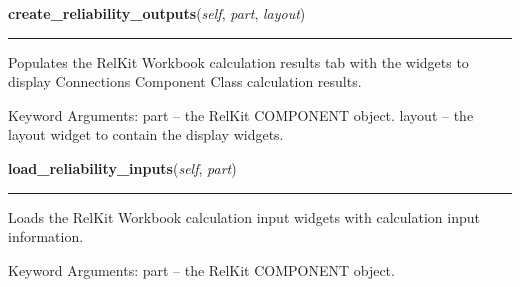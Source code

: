 \hspace{.8\funcindent}\begin{boxedminipage}{\funcwidth}

    \raggedright \textbf{create\_reliability\_outputs}(\textit{self}, \textit{part}, \textit{layout})

    \vspace{-1.5ex}

    \rule{\textwidth}{0.5\fboxrule}
\setlength{\parskip}{2ex}
    Populates the RelKit Workbook calculation results tab with the 
    widgets to display Connections Component Class calculation results.

    Keyword Arguments: part   -- the RelKit COMPONENT object. layout -- 
    the layout widget to contain the display widgets.

\setlength{\parskip}{1ex}
    \end{boxedminipage}

    \label{reliafree:connections:connection:Connection:load_reliability_inputs}

    \vspace{0.5ex}

\hspace{.8\funcindent}\begin{boxedminipage}{\funcwidth}

    \raggedright \textbf{load\_reliability\_inputs}(\textit{self}, \textit{part})

    \vspace{-1.5ex}

    \rule{\textwidth}{0.5\fboxrule}
\setlength{\parskip}{2ex}
    Loads the RelKit Workbook calculation input widgets with calculation
    input information.

    Keyword Arguments: part -- the RelKit COMPONENT object.

\setlength{\parskip}{1ex}
    \end{boxedminipage}

    \label{reliafree:connections:connection:Connection:load_reliability_outputs}

